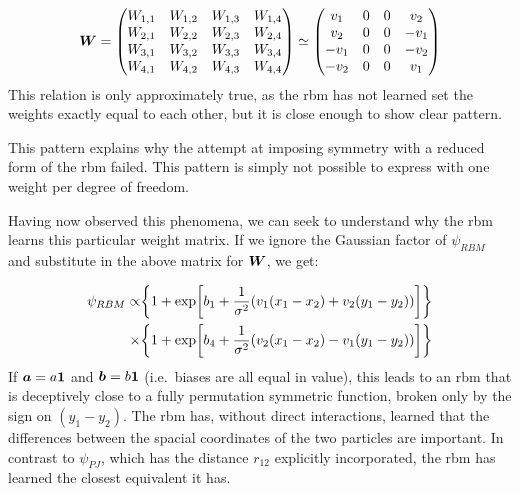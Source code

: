 \documentclass[Thesis.tex]{subfiles}
\begin{document}
\begin{align}
  \mat W = \mqty(
                    W_{1,1} & W_{1,2} & W_{1,3} & W_{1,4}\\
                    W_{2,1} & W_{2,2} & W_{2,3} & W_{2,4}\\
                    W_{3,1} & W_{3,2} & W_{3,3} & W_{3,4}\\
                    W_{4,1} & W_{4,2} & W_{4,3} & W_{4,4}
                )
                                                  \simeq \mqty(
                                                   v_1 & 0 & 0 &  v_2\\
                                                   v_2 & 0 & 0 & -v_1\\
                                                  -v_1 & 0 & 0 & -v_2\\
                                                  -v_2 & 0 & 0 &  v_1
                                                  )
\end{align}
This relation is only approximately true, as the \gls{rbm} has not learned set the
weights exactly equal to each other, but it is close enough to show clear
pattern.

This pattern explains why the attempt at imposing symmetry with a reduced form
of the \gls{rbm} failed. This pattern is simply not possible to express with one
weight per degree of freedom.

Having now observed this phenomena, we can seek to understand why the \gls{rbm} learns
this particular weight matrix. If we ignore the Gaussian factor of $\psi_{RBM}$
and substitute in the above matrix for $\bm{W}$, we get:

\begin{align}
  \begin{split}
  \psi_{RBM} \propto &\qty{1 + \exp[b_1 + \frac{1}{\sigma^2}\qty(v_1(x_1-x_2) + v_2(y_1-y_2))]}\\
                   \times &\qty{1 + \exp[b_4 + \frac{1}{\sigma^2}\qty(v_2(x_1-x_2) - v_1(y_1-y_2))]}
  \end{split}
\end{align}
If $\bm{a}=a\bm{1}$ and $\bm{b}=b\bm{1}$ (i.e.\ biases are all equal in value),
this leads to an \gls{rbm} that is deceptively close to a fully permutation symmetric
function, broken only by the sign on $(y_1-y_2)$. The \gls{rbm} has, without direct
interactions, learned that the differences between the spacial coordinates of
the two particles are important. In contrast to $\psi_{PJ}$, which has the
distance $r_{12}$ explicitly incorporated, the \gls{rbm} has learned the closest
equivalent it has.
\end{document}
